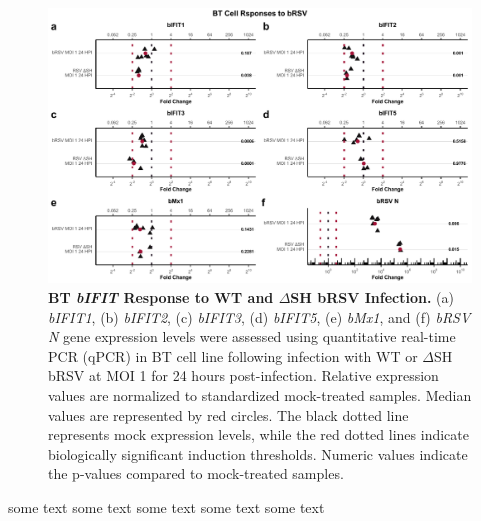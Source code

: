 \begin{figure}
    \centering
    \includegraphics[width=1\linewidth]{07. Chapter 2/Figs/02. Induction/09. bt_brsv.pdf}
    \caption[BT \textit{bIFIT} Response to WT and \(\Delta\)SH bRSV Infection.]{\textbf{BT \textit{bIFIT} Response to WT and \(\Delta\)SH bRSV Infection.} (a) \textit{bIFIT1}, (b) \textit{bIFIT2}, (c) \textit{bIFIT3}, (d) \textit{bIFIT5}, (e) \textit{bMx1}, and (f) \textit{bRSV N} gene expression levels were assessed using quantitative real-time PCR (qPCR) in BT cell line following infection with WT or \(\Delta\)SH bRSV at MOI 1 for 24 hours post-infection. Relative expression values are normalized to standardized mock-treated samples. Median values are represented by red circles. The black dotted line represents mock expression levels, while the red dotted lines indicate biologically significant induction thresholds. Numeric values indicate the p-values compared to mock-treated samples.}
    \label{fig:BT responses to bRSV}
\end{figure}

some text some text some text some text some text


